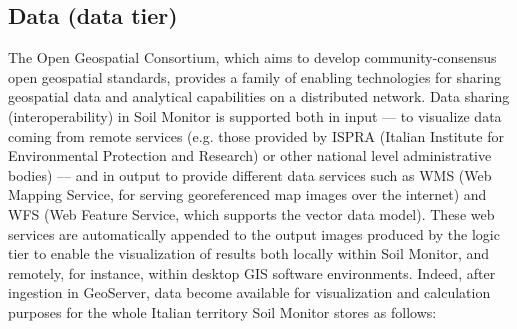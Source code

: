 \documentclass[APA,LATO1COL,doublespace]{WileyNJD-v2}
\begin{document}
\subsection{Data (data tier) }
\label{sec:dataTier}
The Open Geospatial Consortium, which aims to develop community-consensus open geospatial standards, provides a family of enabling technologies for sharing geospatial data and analytical capabilities on a distributed network. 
Data sharing (interoperability) in Soil Monitor is supported both in input --- to visualize data coming from remote services (e.g. those provided by ISPRA (Italian Institute for Environmental Protection and Research) or other national level administrative bodies) --- and in output to provide different data services such as WMS (Web Mapping Service, for serving georeferenced map images over the internet) and WFS (Web Feature Service, which supports the vector data model). %
These web services are automatically appended to the output images produced by the logic tier %
to enable the visualization of results both locally within Soil Monitor, and remotely, for instance, within desktop GIS software environments.
Indeed, after ingestion in GeoServer, data become available for visualization and calculation purposes for the whole Italian territory Soil Monitor stores as follows:
\end{document}
